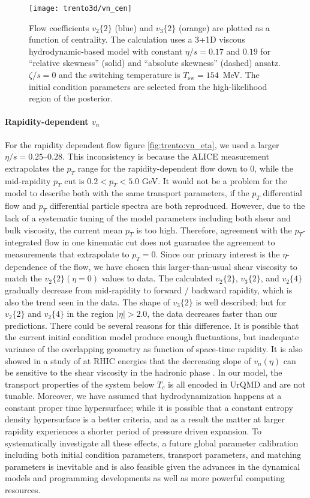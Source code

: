 \begin{figure}
\centering
\texttt{[image: trento3d/vn\_cen]}
\caption{Flow coefficients $v_2\{2\}$ (blue) and $v_3\{2\}$ (orange) are plotted as a function of centrality. The calculation uses a 3+1D viscous hydrodynamic-based model with constant $\eta/s=0.17$ and $0.19$ for ``relative skewness'' (solid) and ``absolute skewness'' (dashed) ansatz. $\zeta/s=0$ and the switching temperature is $T_\text{sw}=154$~MeV.
The initial condition parameters are selected from the high-likelihood region of the posterior.}
\label{fig:trento:vn_cen}
\end{figure}

\paragraph{Rapidity-dependent $v_n$} For the rapidity dependent flow figure \ref{fig:trento:vn_eta}, we used a larger $\eta/s=0.25$--$0.28$. 
This inconsistency is because the ALICE measurement extrapolates the $p_T$ range for the rapidity-dependent flow down to 0, while the mid-rapidity  $p_T$ cut is $0.2 < p_T < 5.0$ GeV.
It would not be a problem for the model to describe both with the same transport parameters, if the $p_T$ differential flow and $p_T$ differential particle spectra are both reproduced.
However, due to the lack of a systematic tuning of the model parameters including both shear and bulk viscosity, the current mean $p_T$ is too high.
Therefore, agreement with the $p_T$-integrated flow in one kinematic cut does not guarantee the agreement to measurements that extrapolate to $p_T = 0$.
Since our primary interest is the $\eta$-dependence of the flow, we have chosen this larger-than-usual shear viscosity to match the $v_2\{2\}(\eta=0)$ values to data.
The calculated $v_2\{2\}$, $v_3\{2\}$, and $v_2\{4\}$ gradually decrease from mid-rapidity to forward / backward rapidity, which is also the trend seen in the data.
The shape of $v_3\{2\}$ is well described; but for $v_2\{2\}$ and $v_2\{4\}$ in the region $|\eta| > 2.0$, the data decreases faster than our predictions.
There could be several reasons for this difference.
It is possible that the current initial condition model produce enough fluctuations, but inadequate variance of the overlapping geometry as function of space-time rapidity.
It is also showed in a study of at RHIC energies that the decreasing slope of $v_n(\eta)$ can be sensitive to the shear viscosity in the hadronic phase \cite{Denicol:2015bnf, Bozek:2010bi}.
In our model, the transport properties of the system below $T_c$ is all encoded in UrQMD and are not tunable. 
Moreover, we have assumed that hydrodynamization happens at a constant proper time hypersurface;
while it is possible that a constant entropy density hypersurface is a better criteria, and as a result the matter at larger rapidity experiences a shorter period of pressure driven expansion.
To systematically investigate all these effects, a future global parameter calibration including both initial condition parameters, transport parameters, and matching parameters is inevitable and is also feasible given the advances in the dynamical models and programming developments as well as more powerful computing resources.

